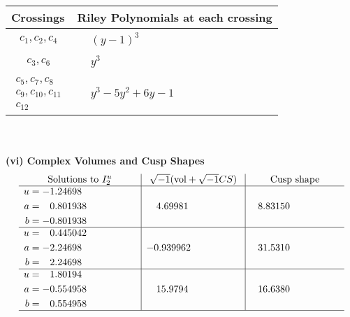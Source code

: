 \documentclass[1p]{elsarticle_modified}
\theoremstyle{definition}
\newcommand{\I}{\sqrt{-1}}
\begin{document}
\begin{tabular}{m{50pt}|m{274pt}}
Crossings & \hspace{64pt}Riley Polynomials at each crossing \\
\hline $$\begin{aligned}c_{1},c_{2},c_{4}\end{aligned}$$&$\begin{aligned}
&(y-1)^3
\end{aligned}$\\
\hline $$\begin{aligned}c_{3},c_{6}\end{aligned}$$&$\begin{aligned}
&y^3
\end{aligned}$\\
\hline $$\begin{aligned}c_{5},c_{7},c_{8}\\c_{9},c_{10},c_{11}\\c_{12}\end{aligned}$$&$\begin{aligned}
&y^3-5 y^2+6 y-1
\end{aligned}$\\
\hline
\end{tabular}\\~\\
\newpage\flushleft \textbf{(vi) Complex Volumes and Cusp Shapes}
$$\begin{array}{c|c|c}  
\text{Solutions to }I^u_{2}& \I (\text{vol} + \sqrt{-1}CS) & \text{Cusp shape}\\
 \hline 
\begin{aligned}
u &= -1.24698\phantom{ +0.000000I} \\
a &= \phantom{-}0.801938\phantom{ +0.000000I} \\
b &= -0.801938\phantom{ +0.000000I}\end{aligned}
 & \phantom{-}4.69981\phantom{ +0.000000I} & \phantom{-}8.83150\phantom{ +0.000000I} \\ \hline\begin{aligned}
u &= \phantom{-}0.445042\phantom{ +0.000000I} \\
a &= -2.24698\phantom{ +0.000000I} \\
b &= \phantom{-}2.24698\phantom{ +0.000000I}\end{aligned}
 & -0.939962\phantom{ +0.000000I} & \phantom{-}31.5310\phantom{ +0.000000I} \\ \hline\begin{aligned}
u &= \phantom{-}1.80194\phantom{ +0.000000I} \\
a &= -0.554958\phantom{ +0.000000I} \\
b &= \phantom{-}0.554958\phantom{ +0.000000I}\end{aligned}
 & \phantom{-}15.9794\phantom{ +0.000000I} & \phantom{-}16.6380\phantom{ +0.000000I}\\
 \hline 
 \end{array}$$\newpage\newpage\renewcommand{\arraystretch}{1}
\end{document}
